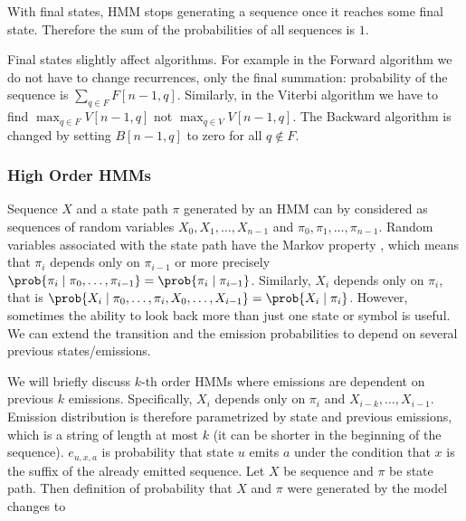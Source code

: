 With final states, HMM stops generating a sequence once it reaches some final
state. Therefore the sum of the probabilities of all sequences is $1$.

Final states slightly affect algorithms. For example in the Forward algorithm
we do not have to change recurrences, only the final summation: probability of
the sequence is $\sum_{q\in F}F[n-1,q]$.  Similarly, in the Viterbi algorithm
we have to find $\max_{q\in F} V[n-1,q]$ not $\max_{q\in V} V[n-1,q]$.  The
Backward algorithm is changed by setting $B[n-1,q]$ to zero for all $q\notin
F$.

\subsubsection{High Order HMMs}

Sequence $X$ and a state path $\pi$ generated by an HMM can by considered as
sequences of random variables $X_0,X_1,\dots, X_{n-1}$ and
$\pi_0,\pi_1,\dots,\pi_{n-1}$.  Random variables associated with the state path
have the Markov property \cite{Levin2006}, which means that $\pi_i$ depends
only on $\pi_{i-1}$ or more precisely
$\prob{\pi_i\mid\pi_0,\dots,\pi_{i-1}}=\prob{\pi_i\mid\pi_{i-1}}$. Similarly,
$X_i$ depends only on $\pi_i$, that is
$\prob{X_i\mid\pi_0,\dots,\pi_i,X_0,\dots,X_{i-1}}=\prob{X_i\mid\pi_i}$.
However, sometimes the  ability to look back more than just one state or symbol
is useful. We can extend the transition and the emission probabilities to
depend on several previous states/emissions. 

\nocite{Brejova2005,Alexanderson2004}
We will briefly discuss $k$-th order HMMs where emissions are dependent on
previous $k$ emissions. Specifically, $X_i$ depends only on $\pi_i$ and
$X_{i-k},\dots,X_{i-1}$. Emission distribution is therefore parametrized by
state and previous emissions, which is a string of length at most $k$ (it can be
shorter in the beginning of the sequence). $e_{u,x,a}$ is probability that
state $u$ emits $a$ under the condition that $x$ is the suffix of the already emitted
sequence. Let $X$ be sequence and $\pi$ be state path. Then definition
of probability that $X$ and $\pi$ were generated by the model changes to

